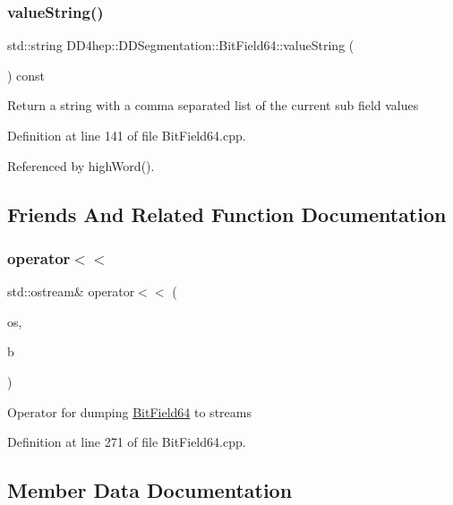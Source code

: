 \subsubsection{\texorpdfstring{value\+String()}{valueString()}}
{\footnotesize\ttfamily std\+::string D\+D4hep\+::\+D\+D\+Segmentation\+::\+Bit\+Field64\+::value\+String (\begin{DoxyParamCaption}{ }\end{DoxyParamCaption}) const}

Return a string with a comma separated list of the current sub field values 

Definition at line 141 of file Bit\+Field64.\+cpp.



Referenced by high\+Word().



\subsection{Friends And Related Function Documentation}
\hypertarget{class_d_d4hep_1_1_d_d_segmentation_1_1_bit_field64_a6d781e0764c4c38ae618a3431af85e4e}{}\label{class_d_d4hep_1_1_d_d_segmentation_1_1_bit_field64_a6d781e0764c4c38ae618a3431af85e4e} 
\subsubsection{\texorpdfstring{operator$<$$<$}{operator<<}}
{\footnotesize\ttfamily std\+::ostream\& operator$<$$<$ (\begin{DoxyParamCaption}\item[{std\+::ostream \&}]{os,  }\item[{const \hyperlink{class_d_d4hep_1_1_d_d_segmentation_1_1_bit_field64}{Bit\+Field64} \&}]{b }\end{DoxyParamCaption})\hspace{0.3cm}{\ttfamily [friend]}}

Operator for dumping \hyperlink{class_d_d4hep_1_1_d_d_segmentation_1_1_bit_field64}{Bit\+Field64} to streams 

Definition at line 271 of file Bit\+Field64.\+cpp.



\subsection{Member Data Documentation}
\hypertarget{class_d_d4hep_1_1_d_d_segmentation_1_1_bit_field64_a1a8739ee82ff112b34aee61feb39cda3}{}\label{class_d_d4hep_1_1_d_d_segmentation_1_1_bit_field64_a1a8739ee82ff112b34aee61feb39cda3} 
